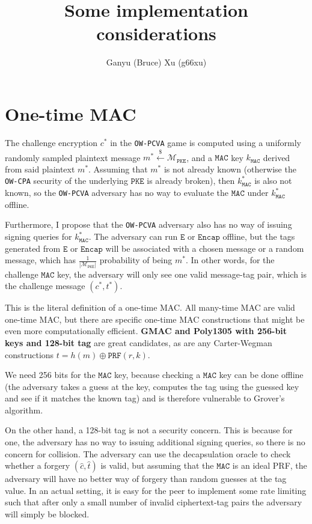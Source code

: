 \documentclass{article}
\title{Some implementation considerations}
\author{Ganyu (Bruce) Xu (g66xu)}
\newcommand{\monospace}{\texttt}
\newcommand{\pke}{\monospace{PKE}}
\newcommand{\encrypt}{\monospace{E}}
\newcommand{\encap}{\monospace{Encap}}
\newcommand{\mac}{\monospace{MAC}}
\newcommand{\leftsample}{\stackrel{\$}{\leftarrow}}
\newcommand{\norm}[1]{\left\lvert #1 \right\rvert}
\begin{document}
\maketitle

\section{One-time MAC}
The challenge encryption $c^\ast$ in the \monospace{OW-PCVA} game is computed using a uniformly randomly sampled plaintext message $m^\ast \leftsample \mathcal{M}_\pke$, and a $\mac$ key $k_\mac$ derived from said plaintext $m^\ast$. Assuming that $m^\ast$ is not already known (otherwise the \monospace{OW-CPA} security of the underlying $\pke$ is already broken), then $k^\ast_\mac$ is also not known, so the \monospace{OW-PCVA} adversary has no way to evaluate the $\mac$ under $k^\ast_\mac$ offline.

Furthermore, I propose that the \monospace{OW-PCVA} adversary also has no way of issuing signing queries for $k^\ast_\mac$. The adversary can run $\encrypt$ or $\encap$ offline, but the tags generated from $\encrypt$ or $\encap$ will be associated with a chosen message or a random message, which has $\frac{1}{\norm{\mathcal{M}_\pke}}$ probability of being $m^\ast$. In other words, for the challenge $\mac$ key, the adversary will only see one valid message-tag pair, which is the challenge message $(c^\ast, t^\ast)$.

This is the literal definition of a one-time MAC. All many-time MAC are valid one-time MAC, but there are specific one-time MAC constructions that might be even more computationally efficient. \textbf{GMAC and Poly1305 with 256-bit keys and 128-bit tag} are great candidates, as are any Carter-Wegman constructions $t = h(m) \oplus \monospace{PRF}(r, k)$.

We need 256 bits for the $\mac$ key, because checking a $\mac$ key can be done offline (the adversary takes a guess at the key, computes the tag using the guessed key and see if it matches the known tag) and is therefore vulnerable to Grover's algorithm.

On the other hand, a 128-bit tag is not a security concern. This is because for one, the adversary has no way to issuing additional signing queries, so there is no concern for collision. The adversary can use the decapsulation oracle to check whether a forgery $(\hat{c}, \hat{t})$ is valid, but assuming that the $\mac$ is an ideal PRF, the adversary will have no better way of forgery than random guesses at the tag value. In an actual setting, it is easy for the peer to implement some rate limiting such that after only a small number of invalid ciphertext-tag pairs the adversary will simply be blocked.
\end{document}
